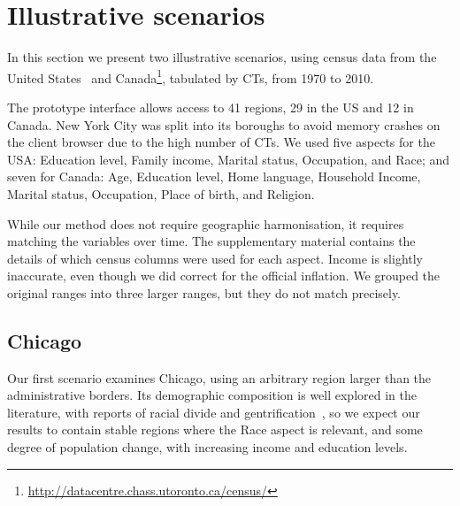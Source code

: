 \section{Illustrative scenarios}
\label{sec:study}

In this section we present two illustrative scenarios, using census data from
the United States~\citep{nhgis} and
Canada\footnote{\url{http://datacentre.chass.utoronto.ca/census/}}, tabulated by
CTs,  from 1970 to 2010. 

The prototype interface allows access to 41 regions, 29
in the US and 12 in Canada. New York City was split into its boroughs to avoid
memory crashes on the client browser due to the high number of CTs.  We used
five aspects for the USA: Education level, Family income, Marital status,
Occupation, and Race; and seven for Canada: Age, Education level, Home language,
Household Income, Marital status, Occupation, Place of birth, and Religion. 

While our method does not require geographic harmonisation, it requires matching
the variables over time. The supplementary material contains the details of
which census columns were used for each aspect. Income is slightly inaccurate,
even though we did correct for the official inflation. We grouped the original
ranges into three larger ranges, but they do not match precisely.


\subsection{Chicago}
Our first scenario examines Chicago, using an arbitrary region larger than the
administrative borders. Its demographic composition is well explored in the
literature, with reports of racial divide and
gentrification~\citep{Delmelle2016,Delmelle2017,Hwang2014}, so we expect our
results to contain stable regions where the Race aspect is relevant, and some
degree of population change, with increasing income and education levels. 


